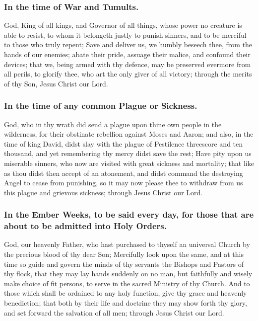 \subsubsection{In the time of War and Tumults.}
 God, King of all kings, and Governor of all things, whose power no creature is able to resist, to whom it belongeth justly to punish sinners, and to be merciful to those who truly repent; Save and deliver us, we humbly beseech thee, from the hands of our enemies; abate their pride, assuage their malice, and confound their devices; that we, being armed with thy defence, may be preserved evermore from all perils, to glorify thee, who art the only giver of all victory; through the merits of thy Son, Jesus Christ our Lord.

\subsubsection{In the time of any common Plague or Sickness.}
 God, who in thy wrath did send a plague upon thine own people in the wilderness, for their obstinate rebellion against Moses and Aaron; and also, in the time of king David, didst slay with the plague of Pestilence threescore and ten thousand, and yet remembering thy mercy didst save the rest; Have pity upon us miserable sinners, who now are visited with great sickness and mortality; that like as thou didst then accept of an atonement, and didst command the destroying Angel to cease from punishing, so it may now please thee to withdraw from us this plague and grievous sickness; through Jesus Christ our Lord.

\subsubsection{In the Ember Weeks, to be said every day, for those that are about to be admitted into Holy Orders.}
 God, our heavenly Father, who hast purchased to thyself an universal Church by the precious blood of thy dear Son; Mercifully look upon the same, and at this time so guide and govern the minds of thy servants the Bishops and Pastors of thy flock, that they may lay hands suddenly on no man, but faithfully and wisely make choice of fit persons, to serve in the sacred Ministry of thy Church. And to those which shall be ordained to any holy function, give thy grace and heavenly benediction; that both by their life and doctrine they may show forth thy glory, and set forward the salvation of all men; through Jesus Christ our Lord.

